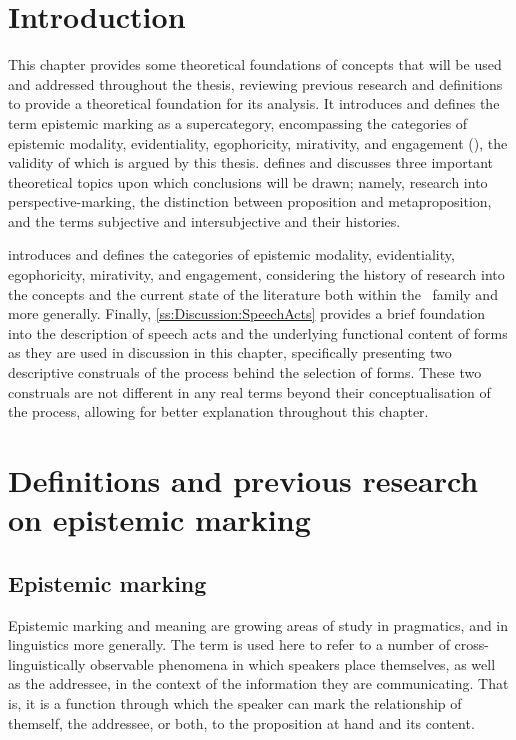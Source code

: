 \section{Introduction}
This chapter provides some theoretical foundations of concepts that will be used and addressed throughout the thesis, reviewing previous research and definitions to provide a theoretical foundation for its analysis. It introduces and defines the term epistemic marking as a supercategory, encompassing the categories of epistemic modality, evidentiality, egophoricity, mirativity, and engagement (), the validity of which is argued by this thesis.  defines and discusses three important theoretical topics upon which conclusions will be drawn; namely, research into perspective-marking, the distinction between proposition and metaproposition, and the terms subjective and intersubjective and their histories.

 introduces and defines the categories of epistemic modality, evidentiality, egophoricity, mirativity, and engagement, considering the history of research into the concepts and the current state of the literature both within the \lfam\ family and more generally. Finally, \ref{ss:Discussion:SpeechActs} provides a brief foundation into the description of speech acts and the underlying functional content of forms as they are used in discussion in this chapter, specifically presenting two descriptive construals of the process behind the selection of forms. These two construals are not different in any real terms beyond their conceptualisation of the process, allowing for better explanation throughout this chapter.

\section{Definitions and previous research on epistemic marking}\label{s:Intro:EpistemicIntro}
\subsection{Epistemic marking}
Epistemic marking and meaning are growing areas of study in pragmatics, and in linguistics more generally. The term is used here to refer to a number of cross-linguistically observable phenomena in which speakers place themselves, as well as the addressee, in the context of the information they are communicating. That is, it is a function through which the speaker can mark the relationship of themself, the addressee, or both, to the proposition at hand and its content. 

